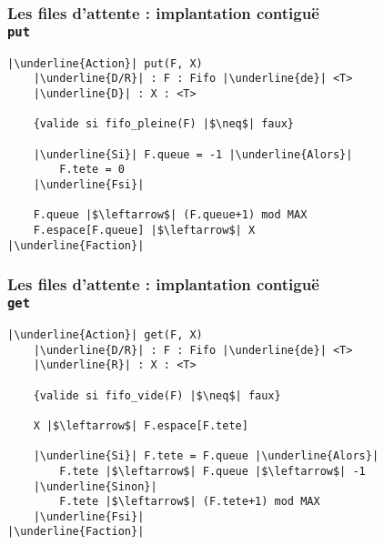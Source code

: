 \documentclass[table,handout,tikz,12pt,svgnames]{beamer}
\begin{document}
\begin{frame}[fragile=singleslide]
	\frametitle{Les files d'attente : implantation contiguë\\ \texttt{put}}
	\begin{block}{}
		\begin{verbatim}
|\underline{Action}| put(F, X)
	|\underline{D/R}| : F : Fifo |\underline{de}| <T>
	|\underline{D}| : X : <T>
	
	{valide si fifo_pleine(F) |$\neq$| faux}

	|\underline{Si}| F.queue = -1 |\underline{Alors}|
		F.tete = 0
	|\underline{Fsi}|

	F.queue |$\leftarrow$| (F.queue+1) mod MAX
	F.espace[F.queue] |$\leftarrow$| X
|\underline{Faction}|
		\end{verbatim}
	\end{block}
\end{frame}


\begin{frame}[fragile=singleslide]
	\frametitle{Les files d'attente : implantation contiguë\\ \texttt{get}}
	\vspace{-0.4cm}
	\begin{block}{}
		\begin{verbatim}
|\underline{Action}| get(F, X)
	|\underline{D/R}| : F : Fifo |\underline{de}| <T>
	|\underline{R}| : X : <T>

	{valide si fifo_vide(F) |$\neq$| faux}

	X |$\leftarrow$| F.espace[F.tete]

	|\underline{Si}| F.tete = F.queue |\underline{Alors}|
		F.tete |$\leftarrow$| F.queue |$\leftarrow$| -1
	|\underline{Sinon}|
		F.tete |$\leftarrow$| (F.tete+1) mod MAX
	|\underline{Fsi}|
|\underline{Faction}|
		\end{verbatim}
	\end{block}
\end{frame}

\end{document}
